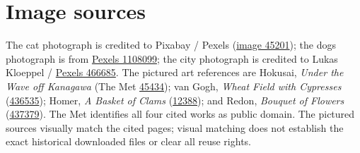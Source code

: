 \documentclass[10pt,letterpaper]{article}
\begin{document}
\section*{Image sources}
The cat photograph is credited to Pixabay / Pexels (\href{https://www.pexels.com/photo/white-and-grey-kitten-on-brown-and-black-leopard-print-textile-45201/}{image 45201}); the dogs photograph is from \href{https://www.pexels.com/photo/1108099/}{Pexels 1108099}; the city photograph is credited to Lukas Kloeppel / \href{https://www.pexels.com/photo/empire-state-building-new-york-466685/}{Pexels 466685}. The pictured art references are Hokusai, \emph{Under the Wave off Kanagawa} (The Met \href{https://www.metmuseum.org/art/collection/search/45434}{45434}); van Gogh, \emph{Wheat Field with Cypresses} (\href{https://www.metmuseum.org/art/collection/search/436535}{436535}); Homer, \emph{A Basket of Clams} (\href{https://www.metmuseum.org/art/collection/search/12388}{12388}); and Redon, \emph{Bouquet of Flowers} (\href{https://www.metmuseum.org/art/collection/search/437379}{437379}). The Met identifies all four cited works as public domain. The pictured sources visually match the cited pages; visual matching does not establish the exact historical downloaded files or clear all reuse rights.
\end{document}
